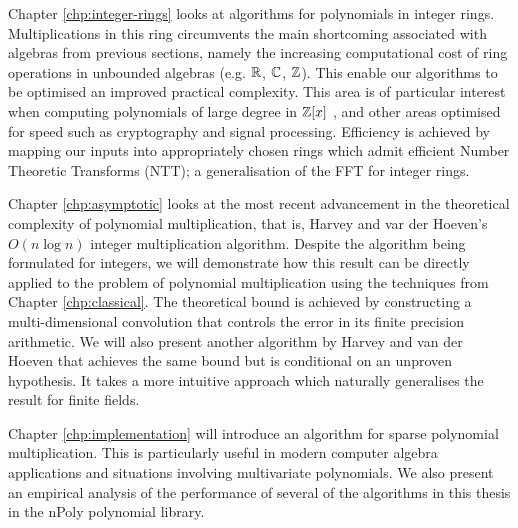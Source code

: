 Chapter \ref{chp:integer-rings} looks at algorithms for polynomials in integer rings. Multiplications in this ring circumvents the main shortcoming associated with algebras from previous sections, namely the increasing computational cost of ring operations in unbounded algebras (e.g. ${\mathbb R}$, ${\mathbb C}$, ${\mathbb Z}$). This enable our algorithms to be optimised an improved practical complexity. This area is of particular interest when computing polynomials of large degree in ${\mathbb Z}[x]$ \cite{crt-parallel-mul}\cite{crt-mul-gpu}, and other areas optimised for speed such as cryptography and signal processing. Efficiency is achieved by mapping our inputs into appropriately chosen rings which admit efficient Number Theoretic Transforms (NTT); a generalisation of the FFT for integer rings.

Chapter \ref{chp:asymptotic} looks at the most recent advancement in the theoretical complexity of polynomial multiplication, that is, Harvey and var der Hoeven's $O(n \log n)$ integer multiplication algorithm. Despite the algorithm \cite{nlogn} being formulated for integers, we will demonstrate how this result can be directly applied to the problem of polynomial multiplication using the techniques from Chapter \ref{chp:classical}. The theoretical bound is achieved by constructing a multi-dimensional convolution that controls the error in its finite precision arithmetic. We will also present another algorithm by Harvey and van der Hoeven that achieves the same bound but is conditional on an unproven hypothesis. It takes a more intuitive approach which naturally generalises the result for finite fields.

Chapter \ref{chp:implementation} will introduce an algorithm for sparse polynomial multiplication. This is particularly useful in modern computer algebra applications and situations involving multivariate polynomials. We also present an empirical analysis of the performance of several of the algorithms in this thesis in the nPoly polynomial library.
